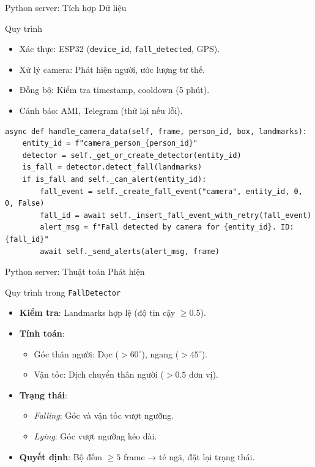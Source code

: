 \begin{frame}[fragile]{Python server: Tích hợp Dữ liệu}
    \begin{block}{Quy trình}
        \begin{itemize}
            \item Xác thực: ESP32 (\texttt{device\_id}, \texttt{fall\_detected}, GPS).
            \item Xử lý camera: Phát hiện người, ước lượng tư thế.
            \item Đồng bộ: Kiểm tra timestamp, cooldown (5 phút).
            \item Cảnh báo: AMI, Telegram (thử lại nếu lỗi).
        \end{itemize}
    \end{block}
    \begin{verbatim}
async def handle_camera_data(self, frame, person_id, box, landmarks):
    entity_id = f"camera_person_{person_id}"
    detector = self._get_or_create_detector(entity_id)
    is_fall = detector.detect_fall(landmarks)
    if is_fall and self._can_alert(entity_id):
        fall_event = self._create_fall_event("camera", entity_id, 0, 0, False)
        fall_id = await self._insert_fall_event_with_retry(fall_event)
        alert_msg = f"Fall detected by camera for {entity_id}. ID: {fall_id}"
        await self._send_alerts(alert_msg, frame)
    \end{verbatim}
    \label{subsubsec:multi_input_fusion}
\end{frame}

\begin{frame}{Python server: Thuật toán Phát hiện}
    \begin{block}{Quy trình trong \texttt{FallDetector}}
        \begin{itemize}
            \item \textbf{Kiểm tra}: Landmarks hợp lệ (độ tin cậy $\geq 0.5$).
            \item \textbf{Tính toán}: 
                \begin{itemize}
                    \item Góc thân người: Dọc ($>60^\circ$), ngang ($>45^\circ$).
                    \item Vận tốc: Dịch chuyển thân người ($>0.5$ đơn vị).
                \end{itemize}
            \item \textbf{Trạng thái}:
                \begin{itemize}
                    \item \textit{Falling}: Góc và vận tốc vượt ngưỡng.
                    \item \textit{Lying}: Góc vượt ngưỡng kéo dài.
                \end{itemize}
            \item \textbf{Quyết định}: Bộ đếm $\geq 5$ frame → té ngã, đặt lại trạng thái.
        \end{itemize}
    \end{block}
    \label{subsubsec:fall_detection_algorithm}
\end{frame}

